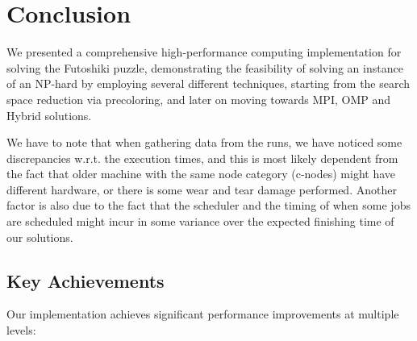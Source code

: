 \section{Conclusion}
\label{sec:conclusion}
We presented a comprehensive high-performance computing implementation for solving the Futoshiki puzzle, demonstrating the feasibility of solving an instance of an NP-hard by employing several different techniques, starting from the search space reduction via precoloring, and later on moving towards MPI, OMP and Hybrid solutions.

We have to note that when gathering data from the runs, we have noticed some discrepancies w.r.t. the execution times, and this is most likely dependent from the fact that older machine with the same node category (c-nodes) might have different hardware, or there is some wear and tear damage performed. Another factor is also due to the fact that the scheduler and the timing of when some jobs are scheduled might incur in some variance over the expected finishing time of our solutions.

\subsection{Key Achievements}
Our implementation achieves significant performance improvements at multiple levels:

